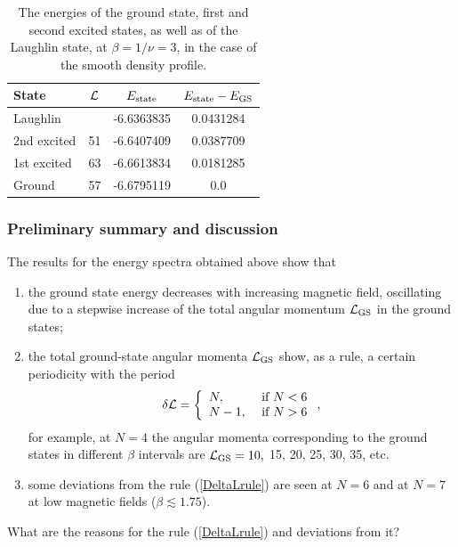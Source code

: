 \documentclass[aps,prb,10pt%
]{revtex4-2}
\def\be{\begin{equation}}
\def\ee{\end{equation}}
\begin{document}
\begin{table}[!ht]
\caption{The energies of the ground state, first and second excited states, as well as of the Laughlin state, at $\beta=1/\nu =3$, in the case of the smooth density profile. \label{tab:N7EnergyGS1st2ndLauSmooth}}
\begin{tabular}{l|c|c|c}
\hspace{3mm}State & \hspace{2mm}${\cal L}$ \hspace{2mm}  & \hspace{5mm}$E_{\rm state}$ \hspace{5mm}  & \hspace{5mm}$E_{\rm state}-E_{\rm GS}$\hspace{5mm}\\
\hline
Laughlin & &	-6.6363835 &	0.0431284 \\
2nd excited &	51&	-6.6407409 & 0.0387709 \\
1st excited &	63	& -6.6613834 &	0.0181285 \\
Ground  &	57	& -6.6795119 & 0.0 \\
\end{tabular}
\end{table}

\subsubsection{Preliminary summary and discussion\label{sec:prelim-sum}}

The results for the energy spectra obtained above show that
\begin{enumerate}
\item the ground state energy decreases with increasing magnetic field, oscillating due to a stepwise increase of the total angular momentum ${\cal L}_{\rm GS}$ in the ground states;
\item the total ground-state angular momenta ${\cal L}_{\rm GS}$ show, as a rule, a certain periodicity with the period 
\be 
\delta{\cal L}=\left\{
\begin{array}{ll}
N, &\textrm{ if }N< 6 \\
N-1, &\textrm{ if }N> 6 \\
\end{array}
\right.,
\label{DeltaLrule}
\ee
for example, at $N=4$ the angular momenta corresponding to the ground states in different $\beta$ intervals are ${\cal L}_{\rm GS}=10,$ 15, 20, 25, 30, 35, etc.  
\item some deviations from the rule (\ref{DeltaLrule}) are seen at $N=6$ and at $N=7$ at low magnetic fields ($\beta\lesssim 1.75$).
\end{enumerate}
What are the reasons for the rule (\ref{DeltaLrule}) and deviations from it? 
\end{document}

